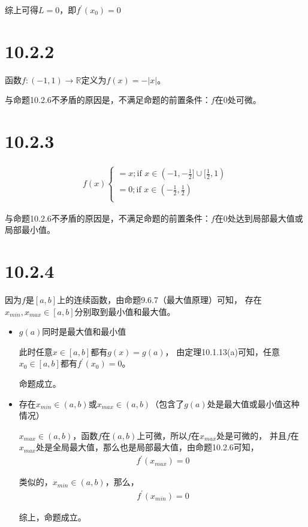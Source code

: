 \documentclass{article}
\begin{document}
综上可得$L = 0$，即$f^\prime(x_0) = 0$

\section*{10.2.2}

函数$f: (-1, 1) \to \mathbb{R}$定义为$f(x) = -|x|$。

与命题10.2.6不矛盾的原因是，不满足命题的前置条件：$f$在$0$处可微。

\section*{10.2.3}

\begin{align*}
  f(x)
  \begin{cases*}
    = x; \text{if } x \in (-1, -\frac{1}{2}] \cup [\frac{1}{2}, 1) \\
    = 0; \text{if } x \in (-\frac{1}{2}, \frac{1}{2})              \\
  \end{cases*}
\end{align*}

与命题10.2.6不矛盾的原因是，不满足命题的前置条件：$f$在$0$处达到局部最大值或局部最小值。

\section*{10.2.4}

因为$f$是$[a, b]$上的连续函数，由命题9.6.7（最大值原理）可知，
存在$x_{min}, x_{max} \in [a, b]$分别取到最小值和最大值。

\begin{itemize}
  \item $g(a)$同时是最大值和最小值

        此时任意$x \in [a, b]$都有$g(x) = g(a)$，
        由定理10.1.13(a)可知，任意$x_0 \in [a, b]$都有$f^\prime(x_0) = 0$。

        命题成立。

  \item 存在$x_{min} \in (a, b)$或$x_{max} \in (a, b)$（包含了$g(a)$处是最大值或最小值这种情况）

        $x_{max} \in (a, b)$，函数$f$在$(a, b)$上可微，所以$f$在$x_{max}$处是可微的，
        并且$f$在$x_{max}$处是全局最大值，那么也是局部最大值，由命题10.2.6可知，
        \begin{align*}
          f^\prime(x_{max}) = 0
        \end{align*}

        类似的，$x_{min} \in (a, b)$，那么，
        \begin{align*}
          f^\prime(x_{min}) = 0
        \end{align*}

        综上，命题成立。

\end{itemize}
\end{document}
